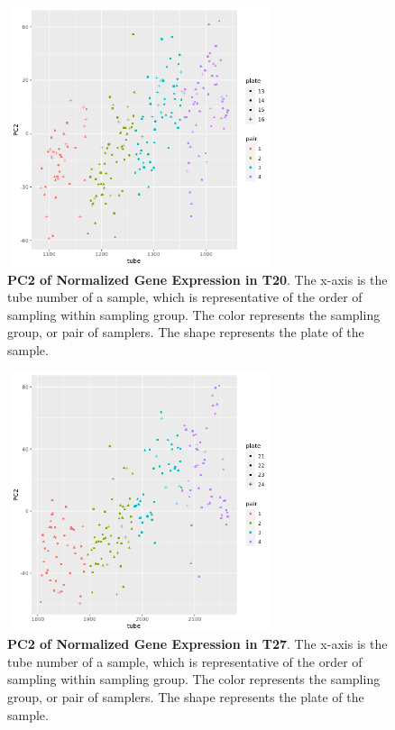 \documentclass[article,9pt,twocolumn,twoside]{rilabRxiv}
\begin{document}
\begin{figure}[!ht]
\centering
\includegraphics[width=0.7\textwidth,height=3in]{figures/WD_0720_PC2_pair_tube.png}
\caption{\textbf{PC2 of Normalized Gene Expression in T20}. The x-axis is the tube number of a sample, which is representative of the order of sampling within sampling group. The color represents the sampling group, or pair of samplers. The shape represents the plate of the sample.}
\label{fig:chapter2_t20pc2}
\end{figure}

\begin{figure}[!ht]
\centering
\includegraphics[width=0.7\textwidth,height=3in]{figures/WD_0727_PC2_pair_tube.png}
\caption{\textbf{PC2 of Normalized Gene Expression in T27}. The x-axis is the tube number of a sample, which is representative of the order of sampling within sampling group. The color represents the sampling group, or pair of samplers. The shape represents the plate of the sample.}
\label{fig:chapter2_t27pc2}
\end{figure}
\end{document}
